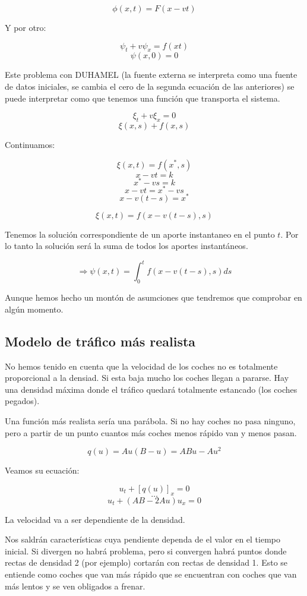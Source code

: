 \documentclass[palatino]{apuntes}
\begin{document}
$$\phi(x,t) = F(x-vt)$$

Y por otro:

$$\psi_t + v\psi_x = f(xt)$$
$$\psi(x,0) = 0$$

Este problema con DUHAMEL (la fuente externa se interpreta como una fuente de datos iniciales, se cambia el cero de la segunda ecuación de las anteriores) se puede interpretar como que tenemos una función que transporta el sistema.

$$\xi_t + v\xi_x = 0$$
$$\xi(x,s) + f(x,s)$$

Continuamos:

$$\xi(x,t) = f(x^*,s)$$
$$x-vt = k$$
$$x^* - vs = k$$
$$x-vt = x^* - vs$$
$$x-v(t-s) = x^{*}$$

$$\xi(x,t) = f(x - v(t-s), s)$$


Tenemos la solución correspondiente de un aporte instantaneo en el punto $t$. Por lo tanto la solución será la suma de todos los aportes instantáneos. 

$$\Rightarrow \psi(x,t) = \int^{t}_{0} f(x-v(t-s),s) ds $$

Aunque hemos hecho un montón de asumciones que tendremos que comprobar en algún momento.

\subsection{Modelo de tráfico más realista}

No hemos tenido en cuenta que la velocidad de los coches no es totalmente proporcional a la densiad. Si esta baja mucho los coches llegan a pararse. Hay una densidad máxima donde el tráfico quedará totalmente estancado (los coches pegados).

Una función más realista sería una parábola. Si no hay coches no pasa ninguno, pero a partir de un punto cuantos más coches menos rápido van y menos pasan.

$$ q(u) = Au (B-u) = ABu - Au^{2} $$

Veamos su ecuación:

$$u_t + [q(u)]_x = 0$$
$$ … $$
$$ u_t + (AB - 2Au) u_x = 0 $$

La velocidad va a ser dependiente de la densidad.

Nos saldrán características cuya pendiente dependa de el valor en el tiempo inicial. Si divergen no habrá problema, pero si convergen habrá puntos donde rectas de densidad 2 (por ejemplo) cortarán con rectas de densidad 1. Esto se entiende como coches que van más rápido que se encuentran con coches que van más lentos y se ven obligados a frenar.
\end{document}
